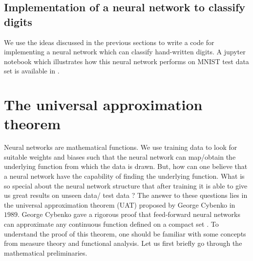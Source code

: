 \subsection{Implementation of a neural network to classify digits}
We use the ideas discussed in the previous sections to write a code for implementing a neural network
which can classify hand-written digits. A jupyter notebook which illustrates how this neural network performs on MNIST test data set is available in \complementary{\theexample}.
\section{The universal approximation theorem}
Neural networks are mathematical functions. We use training data to look for suitable weights and biases
such that the neural network can map/obtain the underlying function from which the data is drawn. But, how can one
believe that a neural network have the capability of finding the underlying function. What is so special about the
neural network structure that after training it is able to give us great results on unseen data/ test data ? The answer to these
questions lies in the universal approximation theorem (UAT) proposed by George Cybenko in $1989$. 
George Cybenko gave a rigorous proof that feed-forward neural networks can approximate any continuous function defined on a compact set \cite{cybenko1989approximation}. To understand the 
proof of this theorem, one should be familiar with some concepts from measure theory and functional analysis. 
Let us first briefly go through the mathematical preliminaries.
